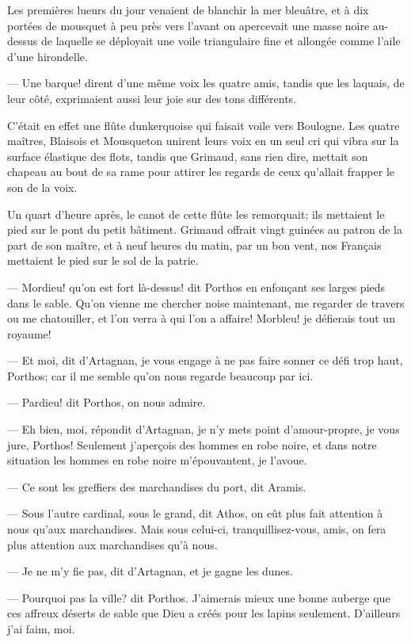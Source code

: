 Les premières lueurs du jour venaient de blanchir la mer bleuâtre, et à dix portées de mousquet à peu près vers l'avant on apercevait une masse noire au-dessus de laquelle se déployait une voile triangulaire fine et allongée comme l'aile d'une hirondelle.

— Une barque! dirent d'une même voix les quatre amis, tandis que les laquais, de leur côté, exprimaient aussi leur joie sur des tons différents.

C'était en effet une flûte dunkerquoise qui faisait voile vers Boulogne.
Les quatre maîtres, Blaisois et Mousqueton unirent leurs voix en un seul cri qui vibra sur la surface élastique des flots, tandis que Grimaud, sans rien dire, mettait son chapeau au bout de sa rame pour attirer les regards de ceux qu'allait frapper le son de la voix.

Un quart d'heure après, le canot de cette flûte les remorquait; ils mettaient le pied sur le pont du petit bâtiment. Grimaud offrait vingt guinées au patron de la part de son maître, et à neuf heures du matin, par un bon vent, nos Français mettaient le pied sur le sol de la patrie.

— Mordieu! qu'on est fort là-dessus! dit Porthos en enfonçant ses larges pieds dans le sable. Qu'on vienne me chercher noise maintenant, me regarder de travers ou me chatouiller, et l'on verra à qui l'on a affaire! Morbleu! je défierais tout un royaume!

— Et moi, dit d'Artagnan, je vous engage à ne pas faire sonner ce défi trop haut, Porthos; car il me semble qu'on nous regarde beaucoup par ici.

— Pardieu! dit Porthos, on nous admire.

— Eh bien, moi, répondit d'Artagnan, je n'y mets point d'amour-propre, je vous jure, Porthos! Seulement j'aperçois des hommes en robe noire, et dans notre situation les hommes en robe noire m'épouvantent, je l'avoue.

— Ce sont les greffiers des marchandises du port, dit Aramis.

— Sous l'autre cardinal, sous le grand, dit Athos, on eût plus fait attention à nous qu'aux marchandises. Mais sous celui-ci, tranquillisez-vous, amis, on fera plus attention aux marchandises qu'à nous.

— Je ne m'y fie pas, dit d'Artagnan, et je gagne les dunes.

— Pourquoi pas la ville? dit Porthos. J'aimerais mieux une bonne auberge que ces affreux déserts de sable que Dieu a créés pour les lapins seulement. D'ailleurs j'ai faim, moi.

